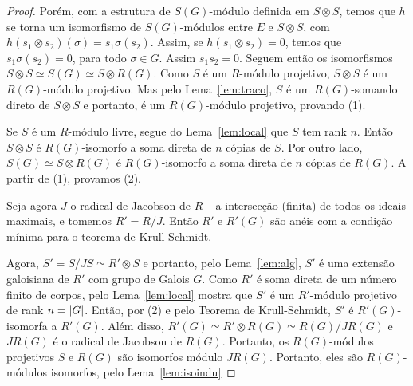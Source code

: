 \begin{teo}
\begin{proof}
Porém, com a estrutura de $S(G)$-módulo definida em $S\otimes S$, temos que $h$ se torna um isomorfismo de $S(G)$-módulos entre $E$ e $S\otimes S$, com $h(s_1 \otimes s_2)(\sigma) = s_1\sigma(s_2)$. Assim, se $h(s_1\otimes s_2) =0$, temos que $s_1 \sigma(s_2) = 0$, para todo $\sigma \in G$. Assim $s_1s_2 =0$.
Seguem então os isomorfismos $S\otimes S \simeq S(G) \simeq S\otimes R(G)$. Como $S$ é um $R$-módulo projetivo, $S\otimes S$ é um $R(G)$-módulo projetivo. Mas pelo Lema~\ref{lem:traco}, $S$ é um $R(G)$-somando direto de $S\otimes S$ e portanto, é um $R(G)$-módulo projetivo, provando (1). \par 
Se $S$ é um $R$-módulo livre, segue do Lema~\ref{lem:local} que $S$ tem rank $n$. Então $S\otimes S$ é $R(G)$-isomorfo a soma direta de $n$ cópias de $S$. Por outro lado, $S(G)\simeq S\otimes R(G)$ é $R(G)$-isomorfo a soma direta de $n$ cópias de $R(G)$. A partir de (1), provamos (2). \par 
Seja agora $J$ o radical de Jacobson de $R$ -- a intersecção (finita) de todos os ideais maximais, e tomemos $R' = R/J$. Então $R'$ e $R'(G)$ são anéis com a condição mínima para o teorema de Krull-Schmidt. \par 
Agora, $S'=S/JS \simeq R'\otimes S$ e portanto, pelo Lema~\ref{lem:alg}, $S'$ é uma extensão galoisiana de $R'$ com grupo de Galois $G$. Como $R'$ é soma direta de um número finito de corpos, pelo Lema~\ref{lem:local} mostra que $S'$ é um $R'$-módulo projetivo de rank $n=\left| G \right|$. Então, por (2) e pelo Teorema de Krull-Schmidt, $S'$ é $R'(G)$-isomorfa a $R'(G)$. Além disso, $R'(G) \simeq R'\otimes R(G)\simeq R(G)/JR(G)$ e $JR(G)$ é o radical de Jacobson de $R(G)$. Portanto, os $R(G)$-módulos projetivos $S$ e $R(G)$ são isomorfos módulo $JR(G)$. Portanto, eles são $R(G)$-módulos isomorfos, pelo Lema~\ref{lem:isoindu}
\end{proof}
\end{teo}

